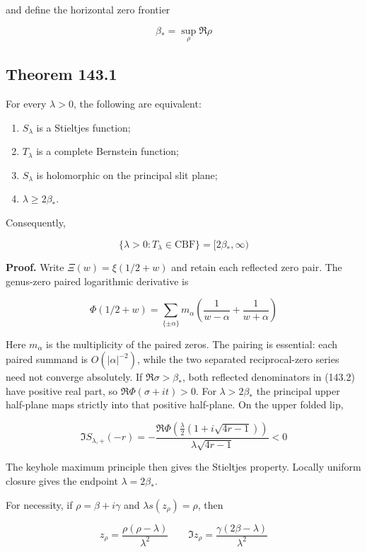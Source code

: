 \documentclass[
  11pt,
]{book}
\providecommand{\tightlist}{%
  \setlength{\itemsep}{0pt}\setlength{\parskip}{0pt}}
\begin{document}
and define the horizontal zero frontier

\[
\beta_*=\sup_\rho\Re\rho
\]

\subsection{Theorem 143.1}\label{theorem-143.1}

For every \(\lambda>0\), the following are equivalent:

\begin{enumerate}
\def\labelenumi{\arabic{enumi}.}
\tightlist
\item
  \(S_\lambda\) is a Stieltjes function;
\item
  \(T_\lambda\) is a complete Bernstein function;
\item
  \(S_\lambda\) is holomorphic on the principal slit plane;
\item
  \(\lambda\ge2\beta_*\).
\end{enumerate}

Consequently,

\[
\boxed{
\{\lambda>0:T_\lambda\in\mathrm{CBF}\}
=[2\beta_*,\infty)}
\tag{143.1}
\]

\textbf{Proof.} Write \(\Xi(w)=\xi(1/2+w)\) and retain each reflected
zero pair. The genus-zero paired logarithmic derivative is

\[
\Phi(1/2+w)
=\sum_{\{\pm\alpha\}}
m_\alpha\left(\frac1{w-\alpha}+\frac1{w+\alpha}\right)
\tag{143.2}
\]

Here \(m_\alpha\) is the multiplicity of the paired zeros. The pairing
is essential: each paired summand is \(O(|\alpha|^{-2})\), while the two
separated reciprocal-zero series need not converge absolutely. If
\(\Re\sigma>\beta_*\), both reflected denominators in (143.2) have
positive real part, so \(\Re\Phi(\sigma+it)>0\). For
\(\lambda>2\beta_*\) the principal upper half-plane maps strictly into
that positive half-plane. On the upper folded lip,

\[
\Im S_{\lambda,+}(-r)
=-\frac{
\Re\Phi\!\left(\frac\lambda2
(1+i\sqrt{4r-1})\right)}
{\lambda\sqrt{4r-1}}<0
\tag{143.3}
\]

The keyhole maximum principle then gives the Stieltjes property. Locally
uniform closure gives the endpoint \(\lambda=2\beta_*\).

For necessity, if \(\rho=\beta+i\gamma\) and \(\lambda s(z_\rho)=\rho\),
then

\[
z_\rho=\frac{\rho(\rho-\lambda)}{\lambda^2}
\qquad
\Im z_\rho=\frac{\gamma(2\beta-\lambda)}{\lambda^2}
\tag{143.4}
\]
\end{document}
